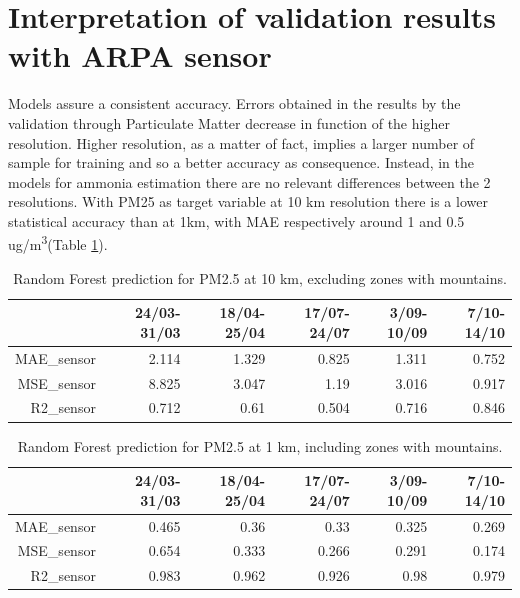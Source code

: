 \section{Interpretation of validation results with ARPA sensor}
Models assure a consistent accuracy.
Errors obtained in the results by the validation through Particulate Matter decrease in function of the higher resolution.
Higher resolution, as a matter of fact, implies a larger number of sample for training and so a better accuracy as consequence.
Instead, in the models for ammonia estimation there are no relevant differences between the 2 resolutions.
With PM25 as target variable at 10 km resolution there is a lower statistical accuracy than at 1km, with MAE respectively around 1 and 0.5 ug/m\textsuperscript{3}(Table \ref{tab:res1km}). 
\begin{table}[H]
\begin{tabular}{rrrrrr}
\hline
      &   24/03-31/03 &   18/04-25/04 &   17/07-24/07 &   3/09-10/09 &   7/10-14/10 \\
\hline
  MAE\_sensor   &            2.114 &            1.329 &            0.825 &            1.311 &            0.752 \\
  MSE\_sensor   &            8.825 &            3.047 &            1.19  &            3.016 &            0.917 \\
  R2\_sensor    &            0.712 &            0.61  &            0.504 &            0.716 &            0.846 \\
\hline
\end{tabular}
\caption{Random Forest prediction for PM2.5 at 10 km, excluding zones with mountains.}
\end{table}
\begin{table}[H]
\begin{tabular}{rrrrrr}
\hline
     &   24/03-31/03 &   18/04-25/04 &   17/07-24/07 &   3/09-10/09 &   7/10-14/10 \\
\hline
   MAE\_sensor   &            0.465 &            0.36  &            0.33  &            0.325 &            0.269 \\
  MSE\_sensor   &            0.654 &            0.333 &            0.266 &            0.291 &            0.174 \\
   R2\_sensor    &            0.983 &            0.962 &            0.926 &            0.98  &            0.979 \\
\hline
\end{tabular}
\caption{Random Forest prediction for PM2.5 at 1 km, including zones with mountains.}
\label{tab:res1km}
\end{table}

